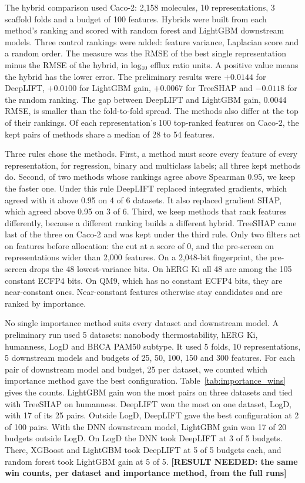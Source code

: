 The hybrid comparison used Caco-2: 2,158 molecules, 10 representations, 3 scaffold folds and a budget of 100 features. Hybrids were built from each method's ranking and scored with random forest and LightGBM downstream models. Three control rankings were added: feature variance, Laplacian score and a random order. The measure was the RMSE of the best single representation minus the RMSE of the hybrid, in log$_{10}$ efflux ratio units. A positive value means the hybrid has the lower error. The preliminary results were $+0.0144$ for DeepLIFT, $+0.0100$ for LightGBM gain, $+0.0067$ for TreeSHAP and $-0.0118$ for the random ranking. The gap between DeepLIFT and LightGBM gain, 0.0044 RMSE, is smaller than the fold-to-fold spread. The methods also differ at the top of their rankings. Of each representation's 100 top-ranked features on Caco-2, the kept pairs of methods share a median of 28 to 54 features.

Three rules chose the methods. First, a method must score every feature of every representation, for regression, binary and multiclass labels; all three kept methods do. Second, of two methods whose rankings agree above Spearman 0.95, we keep the faster one. Under this rule DeepLIFT replaced integrated gradients, which agreed with it above 0.95 on 4 of 6 datasets. It also replaced gradient SHAP, which agreed above 0.95 on 3 of 6. Third, we keep methods that rank features differently, because a different ranking builds a different hybrid. TreeSHAP came last of the three on Caco-2 and was kept under the third rule. Only two filters act on features before allocation: the cut at a score of 0, and the pre-screen on representations wider than 2,000 features. On a 2,048-bit fingerprint, the pre-screen drops the 48 lowest-variance bits. On hERG Ki all 48 are among the 105 constant ECFP4 bits. On QM9, which has no constant ECFP4 bits, they are near-constant ones. Near-constant features otherwise stay candidates and are ranked by importance.

No single importance method suits every dataset and downstream model. A preliminary run used 5 datasets: nanobody thermostability, hERG Ki, humanness, LogD and BRCA PAM50 subtype. It used 5 folds, 10 representations, 5 downstream models and budgets of 25, 50, 100, 150 and 300 features. For each pair of downstream model and budget, 25 per dataset, we counted which importance method gave the best configuration. Table~\ref{tab:importance_wins} gives the counts. LightGBM gain won the most pairs on three datasets and tied with TreeSHAP on humanness. DeepLIFT won the most on one dataset, LogD, with 17 of its 25 pairs. Outside LogD, DeepLIFT gave the best configuration at 2 of 100 pairs. With the DNN downstream model, LightGBM gain won 17 of 20 budgets outside LogD. On LogD the DNN took DeepLIFT at 3 of 5 budgets. There, XGBoost and LightGBM took DeepLIFT at 5 of 5 budgets each, and random forest took LightGBM gain at 5 of 5. \textbf{[RESULT NEEDED: the same win counts, per dataset and importance method, from the full runs]}

